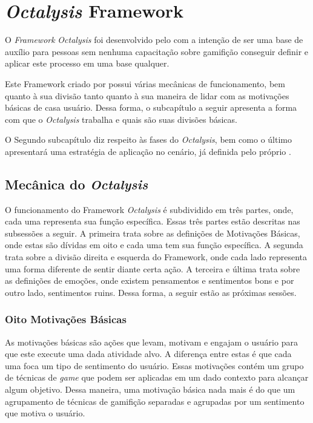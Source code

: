 \section{\textit{Octalysis} Framework}
\label{sub:octalysisframework}
O \textit{Framework} \textit{Octalysis} foi desenvolvido pelo \cite{chou2015actionable} com a intenção de ser uma
base de auxílio para pessoas sem nenhuma capacitação sobre gamifição
conseguir definir e aplicar este processo em uma base qualquer.

Este Framework criado por \cite{chou2015actionable} possui várias mecânicas de funcionamento,
bem quanto à sua divisão tanto quanto à sua maneira de lidar com as
motivações básicas de casa usuário. Dessa forma, o subcapítulo a seguir
apresenta a forma com que o \textit{Octalysis} trabalha e quais são suas divisões básicas.

O Segundo subcapítulo diz respeito às fases do \textit{Octalysis}, bem como o último
apresentará uma estratégia de aplicação no cenário, já definida pelo próprio
\cite{chou2015actionable}.


\subsection{Mecânica do \textit{Octalysis}}
\label{sub:mecanicaoctalysis}
O funcionamento do Framework \textit{Octalysis} é subdividido em três partes, onde,
cada uma representa sua função específica. Essas três partes estão descritas
nas subsessões a seguir. A primeira trata sobre as definições de Motivações
Básicas, onde estas são dívidas em oito e cada uma tem sua função específica.
A segunda trata sobre a divisão direita e esquerda do Framework, onde cada
lado representa uma forma diferente de sentir diante certa ação.
A terceira e última trata sobre as definições de emoções, onde existem
pensamentos e sentimentos bons e por outro lado, sentimentos ruins.
Dessa forma, a seguir estão as próximas sessões.

\subsubsection{Oito Motivações Básicas}
\label{sub:oitomotivacoesbasicas}
As motivações básicas são ações que levam, motivam e engajam
o usuário para que este execute uma dada atividade alvo.
A diferença entre estas é que cada uma foca um tipo de sentimento
do usuário. Essas motivações contém um grupo de técnicas de \textit{game}
que podem ser aplicadas em um dado contexto para alcançar algum
objetivo. Dessa maneira, uma motivação básica nada mais é do
que um agrupamento de técnicas de gamifição separadas e agrupadas
por um sentimento que motiva o usuário.

